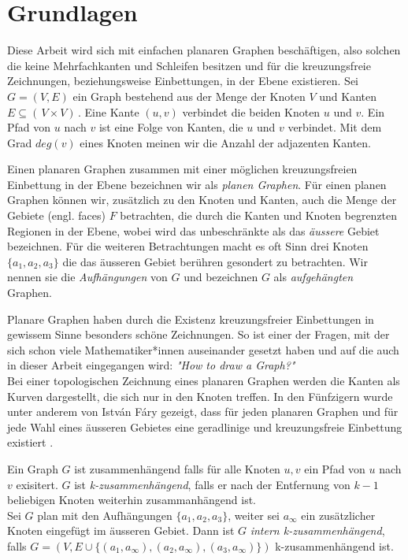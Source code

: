 \chapter{Grundlagen}\label{pre}

Diese Arbeit wird sich mit einfachen planaren Graphen beschäftigen, also solchen die keine Mehrfachkanten und Schleifen besitzen und für die kreuzungsfreie Zeichnungen, beziehungsweise Einbettungen, in der Ebene existieren. Sei $G = (V,E)$ ein Graph bestehend aus der Menge der Knoten $V$ und Kanten $E \subseteq ( \,V \times V ) \,$. Eine Kante $(u,v)$ verbindet die beiden Knoten $u$ und $v$. Ein Pfad von $u$ nach $v$ ist eine Folge von Kanten, die $u$ und $v$ verbindet. Mit dem Grad $deg(v)$ eines Knoten meinen wir die Anzahl der adjazenten Kanten.\ 

Einen planaren Graphen zusammen mit einer möglichen kreuzungsfreien Einbettung in der Ebene bezeichnen wir als \textit{planen Graphen}. Für einen planen Graphen können wir, zusätzlich zu den Knoten und Kanten, auch die Menge der Gebiete (engl. faces) $F$ betrachten, die durch die Kanten und Knoten begrenzten Regionen in der Ebene, wobei wird das unbeschränkte als das \textit{äussere} Gebiet bezeichnen. Für die weiteren Betrachtungen macht es oft Sinn drei Knoten $\{a_1,a_2,a_3\}$ die das äusseren Gebiet berühren gesondert zu betrachten. Wir nennen sie die \textit{Aufhängungen} von $G$ und bezeichnen $G$ als \textit{aufgehängten} Graphen.\

Planare Graphen haben durch die Existenz kreuzungsfreier Einbettungen in gewissem Sinne besonders schöne Zeichnungen. So ist einer der Fragen, mit der sich schon viele Mathematiker*innen auseinander gesetzt haben und auf die auch in dieser Arbeit eingegangen wird: \textit{"How to draw a Graph?"}\cite{tutte63}\\

Bei einer topologischen Zeichnung eines planaren Graphen werden die Kanten als Kurven dargestellt, die sich nur in den Knoten treffen. In den Fünfzigern wurde unter anderem von István Fáry gezeigt, dass für jeden planaren Graphen und für jede Wahl eines äusseren Gebietes eine geradlinige und kreuzungsfreie Einbettung existiert \cite{fary48}.

\begin{definition}\label{int_3_con}
Ein Graph $G$ ist zusammenhängend falls für alle Knoten $u,v$ ein Pfad von $u$ nach $v$ exisitert. $G$ ist \textit{k-zusammenhängend}, falls er nach der Entfernung von $k-1$ beliebigen Knoten weiterhin zusammanhängend ist.\\
Sei $G$ plan mit den Aufhängungen $\{a_1,a_2,a_3\}$, weiter sei $a_\infty$ ein zusätzlicher Knoten eingefügt im äusseren Gebiet. Dann ist $G$ \textit{intern k-zusammenhängend}, falls $G=(V,E\cup \{(a_1,a_\infty),(a_2,a_\infty),(a_3,a_\infty)\})$ k-zusammenhängend ist. 
\end{definition}

